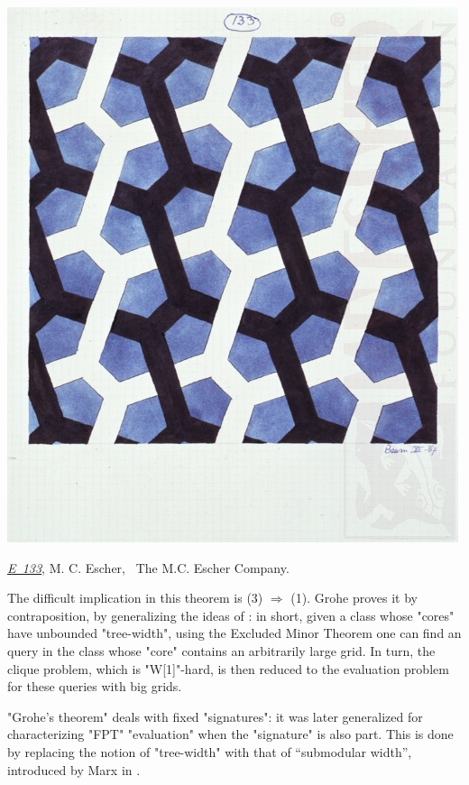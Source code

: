 \begin{marginfigure}
	\centering
	\includegraphics[width=\linewidth]{fig/escher/e133.jpg}
	\caption{\href{https://mcescher.com/gallery/watercolor/\#iLightbox[gallery\_image_1]/3}{\emph{E~133}}, M. C. Escher, \textcopyright~The M.C. Escher Company.}
\end{marginfigure}
The difficult implication in this theorem is (3) $\Rightarrow$ (1).
Grohe proves it by contraposition, by generalizing
the ideas of \cite{GroheSchwentickSegoufin2001Evaluation}:
in short, given a class whose "cores" have unbounded "tree-width",
using the Excluded Minor Theorem \cite[$\ast$ (1.5)]{RobertsonSeymour1986GraphMinors5}
one can find an query in the class whose "core" 
contains an arbitrarily large grid. In turn, the clique problem,
which is "W[1]"-hard, is then reduced to the evaluation problem
for these queries with big grids.

"Grohe's theorem" deals with fixed "signatures": it was later generalized \cite[Theorem~1]{ChenGottlobLanzingerPichler2020Semantic} for characterizing "FPT" "evaluation" when the "signature" is also part. This is done by replacing the notion of "tree-width" with 
that of ``submodular width'', introduced by Marx in \cite{Marx13Tractable}.

